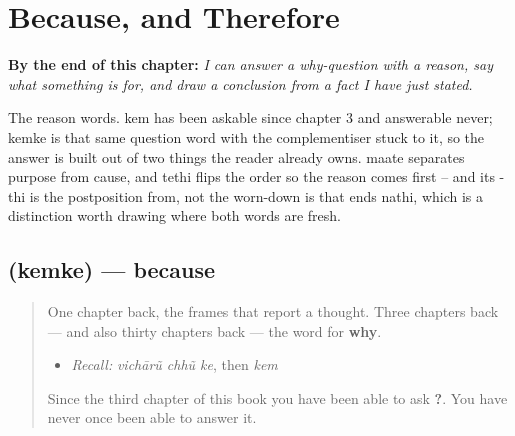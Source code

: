 
\chapter{Because, and Therefore}
\label{ch:gu-because-therefore}

\begin{chapteropening}
\textbf{By the end of this chapter:} \emph{I can answer a why-question with a reason, say what something is for, and draw a conclusion from a fact I have just stated.}

The reason words. kem has been askable since chapter 3 and answerable never; kemke is that same question word with the complementiser stuck to it, so the answer is built out of two things the reader already owns. maate separates purpose from cause, and tethi flips the order so the reason comes first -- and its -thi is the postposition from, not the worn-down is that ends nathi, which is a distinction worth drawing where both words are fresh.
\end{chapteropening}

\section[\texorpdfstring{\gu{કેમકે} (kemke)}{કેમકે (kemke)}]{ (kemke) — because}

\label{lesson:GU-C34-kemke}



\begin{quote}
One chapter back, the frames that report a thought. Three chapters back — and also thirty chapters back — the word for \textbf{why}.

\begin{itemize}
\raggedright
  \item \emph{Recall:} \emph{vichārũ chhũ ke}, then \emph{kem}
\end{itemize}

Since the third chapter of this book you have been able to ask \textbf{?}. You have never once been able to answer it.
\end{quote}

